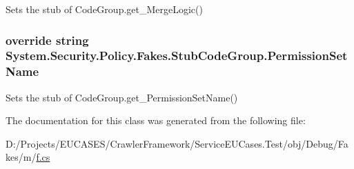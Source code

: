 Sets the stub of Code\-Group.\-get\-\_\-\-Merge\-Logic()

\hypertarget{class_system_1_1_security_1_1_policy_1_1_fakes_1_1_stub_code_group_a619eaa705abd164a4fe3ce36477e1146}{
\subsubsection[{Permission\-Set\-Name}]{\setlength{\rightskip}{0pt plus 5cm}override string System.\-Security.\-Policy.\-Fakes.\-Stub\-Code\-Group.\-Permission\-Set\-Name\hspace{0.3cm}{\ttfamily [get]}}}\label{class_system_1_1_security_1_1_policy_1_1_fakes_1_1_stub_code_group_a619eaa705abd164a4fe3ce36477e1146}


Sets the stub of Code\-Group.\-get\-\_\-\-Permission\-Set\-Name()



The documentation for this class was generated from the following file\-:\begin{DoxyCompactItemize}
\item 
D\-:/\-Projects/\-E\-U\-C\-A\-S\-E\-S/\-Crawler\-Framework/\-Service\-E\-U\-Cases.\-Test/obj/\-Debug/\-Fakes/m/\hyperlink{m_2f_8cs}{f.\-cs}\end{DoxyCompactItemize}
